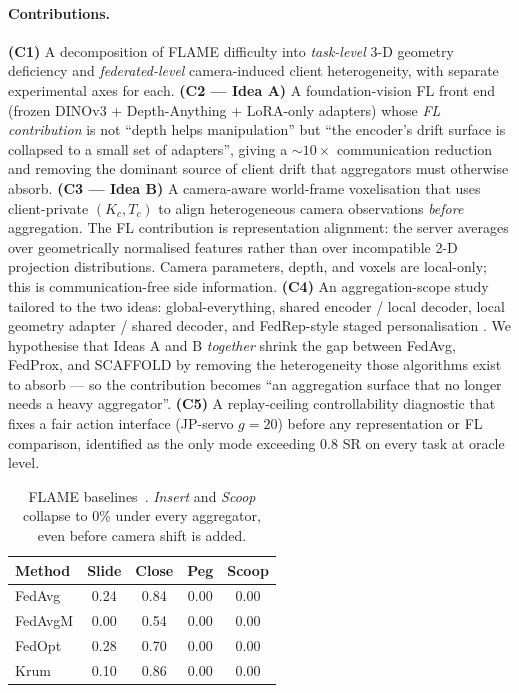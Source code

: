 \documentclass{article}
\begin{document}
\paragraph{Contributions.}
\textbf{(C1)} A decomposition of FLAME difficulty into
\emph{task-level} 3-D geometry deficiency and \emph{federated-level}
camera-induced client heterogeneity, with separate experimental
axes for each.
\textbf{(C2 --- Idea A)} A foundation-vision FL front end (frozen
DINOv3 + Depth-Anything + LoRA-only adapters) whose \emph{FL
contribution} is not ``depth helps manipulation'' but ``the
encoder's drift surface is collapsed to a small set of adapters'',
giving a $\sim\!10\!\times$ communication reduction and removing
the dominant source of client drift that aggregators must
otherwise absorb.
\textbf{(C3 --- Idea B)} A camera-aware world-frame voxelisation
that uses client-private $(K_c, T_c)$ to align heterogeneous
camera observations \emph{before} aggregation. The FL contribution
is representation alignment: the server averages over geometrically
normalised features rather than over incompatible 2-D projection
distributions. Camera parameters, depth, and voxels are
local-only; this is communication-free side information.
\textbf{(C4)} An aggregation-scope study tailored to the two
ideas: global-everything, shared encoder / local decoder, local
geometry adapter / shared decoder, and FedRep-style staged
personalisation \cite{fedrep}. We hypothesise that Ideas A and B
\emph{together} shrink the gap between FedAvg, FedProx, and
SCAFFOLD by removing the heterogeneity those algorithms exist to
absorb --- so the contribution becomes ``an aggregation surface
that no longer needs a heavy aggregator''.
\textbf{(C5)} A replay-ceiling controllability diagnostic that
fixes a fair action interface (JP-servo $g\!=\!20$) before any
representation or FL comparison, identified as the only mode
exceeding 0.8 SR on every task at oracle level.

\begin{table}[h]
\centering
\small
\caption{FLAME baselines~\cite{flame2025}. \emph{Insert} and
\emph{Scoop} collapse to 0\% under every aggregator, even before
camera shift is added.}
\label{tab:flame}
\begin{tabular}{lcccc}
\toprule
Method & Slide & Close & Peg & Scoop\\
\midrule
FedAvg  & 0.24 & 0.84 & 0.00 & 0.00\\
FedAvgM & 0.00 & 0.54 & 0.00 & 0.00\\
FedOpt  & 0.28 & 0.70 & 0.00 & 0.00\\
Krum    & 0.10 & 0.86 & 0.00 & 0.00\\
\bottomrule
\end{tabular}
\end{table}
\end{document}

